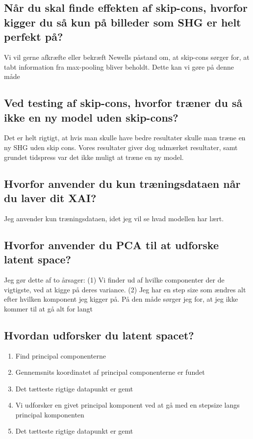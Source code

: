 \documentclass[a4paper]{article}
\begin{document}
\subsection{Når du skal finde effekten af skip-cons, hvorfor kigger du så kun på billeder som SHG er helt perfekt på?}
Vi vil gerne afkræfte eller bekræft Newells påstand om, at skip-cons sørger for, at tabt information fra max-pooling bliver beholdt. Dette kan vi gøre på denne måde

\subsection{Ved testing af skip-cons, hvorfor træner du så ikke en ny model uden skip-cons?}
Det er helt rigtigt, at hvis man skulle have bedre resultater skulle man træne en ny SHG uden skip cons. Vores resultater giver dog udmærket resultater, samt grundet tidspress var det ikke muligt at træne en ny model.

\subsection{Hvorfor anvender du kun træningsdataen når du laver dit XAI?}
Jeg anvender kun træningsdataen, idet jeg vil se hvad modellen har lært.

\subsection{Hvorfor anvender du PCA til at udforske latent space?}
Jeg gør dette af to årsager: (1) Vi finder ud af hvilke componenter der de vigtigste, ved at kigge på deres variance. (2) Jeg har en step size som ændres alt efter hvilken komponent jeg kigger på. På den måde sørger jeg for, at jeg ikke kommer til at gå alt for langt

\subsection{Hvordan udforsker du latent spacet?}
\begin{enumerate}
    \item Find principal componenterne
    \item Gennemsnits koordinatet af principal componenterne er fundet
    \item Det tætteste rigtige datapunkt er gemt
    \item Vi udforsker en givet principal komponent ved at gå med en stepsize langs principal komponenten
    \item Det tætteste rigtige datapunkt er gemt
\end{enumerate}
\end{document}
